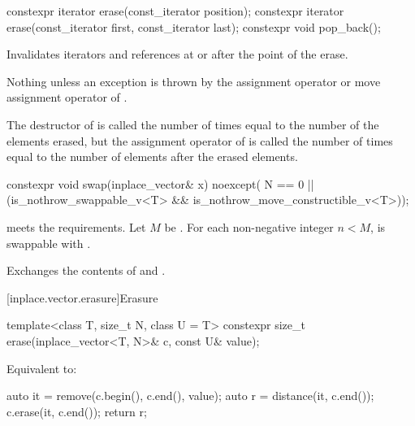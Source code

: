 %
%
\begin{itemdecl}
constexpr iterator erase(const_iterator position);
constexpr iterator erase(const_iterator first, const_iterator last);
constexpr void pop_back();
\end{itemdecl}

\begin{itemdescr}
\pnum
\effects
Invalidates iterators and references at or after the point of the erase.

\pnum
\throws
Nothing unless an exception is thrown by
the assignment operator or move assignment operator of .

\pnum
\complexity
The destructor of  is called the number of times
equal to the number of the elements erased, but
the assignment operator of  is called the number of times
equal to the number of elements after the erased elements.
\end{itemdescr}

%
\begin{itemdecl}
constexpr void swap(inplace_vector& x) noexcept(
  N == 0 || (is_nothrow_swappable_v<T> && is_nothrow_move_constructible_v<T>));
\end{itemdecl}

\begin{itemdescr}
\pnum
\expects
{} meets the  requirements.
Let $M$ be .
For each non-negative integer $n < M$,
 is swappable
with .

\pnum
\effects
Exchanges the contents of  and .
\end{itemdescr}

[inplace.vector.erasure]{Erasure}

%
\begin{itemdecl}
template<class T, size_t N, class U = T>
  constexpr size_t erase(inplace_vector<T, N>& c, const U& value);
\end{itemdecl}

\begin{itemdescr}
\pnum
\effects
Equivalent to:
\begin{codeblock}
auto it = remove(c.begin(), c.end(), value);
auto r = distance(it, c.end());
c.erase(it, c.end());
return r;
\end{codeblock}
\end{itemdescr}

